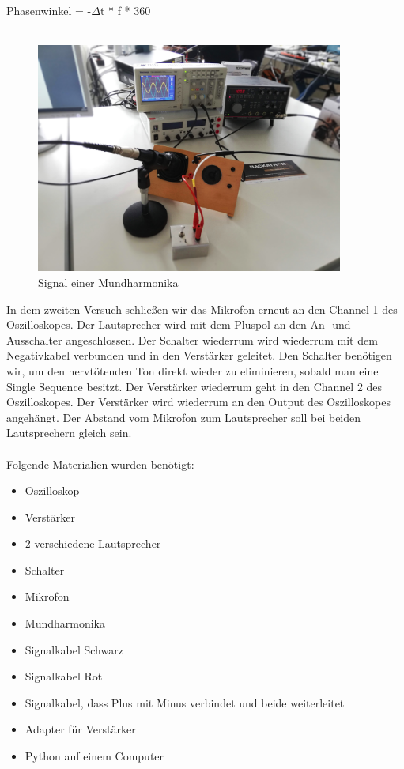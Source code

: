 \documentclass[12pt, oneside, a4paper, \docLanguage]{report}
\begin{document}
Phasenwinkel = -$\Delta$t * f * 360
\\~\\
\begin{figure}[H]
	\centering\small
	\includegraphics[width=0.9\textwidth]{media/aufbau.jpg}
	\caption{Signal einer Mundharmonika}
	\label{img:Signal einer Mundharmonika}
\end{figure}
\newpage
In dem zweiten Versuch schließen wir das Mikrofon erneut an den Channel 1 des Oszilloskopes. Der Lautsprecher wird mit dem Pluspol an den An- und Ausschalter angeschlossen.
Der Schalter wiederrum wird wiederrum mit dem Negativkabel verbunden und in den Verstärker geleitet. 
\newline
Den Schalter benötigen wir, um den nervtötenden Ton direkt wieder zu eliminieren, sobald man eine Single Sequence besitzt. Der Verstärker wiederrum geht in den Channel 2 des Oszilloskopes. 
Der Verstärker wird wiederrum an den Output des Oszilloskopes angehängt.
\newline
Der Abstand vom Mikrofon zum Lautsprecher soll bei beiden Lautsprechern gleich sein.
\\~\\
Folgende Materialien wurden benötigt: ~\par
\begin{itemize}
	\item Oszilloskop
	\item Verstärker
	\item 2 verschiedene Lautsprecher
	\item Schalter 
	\item Mikrofon
	\item Mundharmonika
	\item Signalkabel Schwarz
	\item Signalkabel Rot
	\item Signalkabel, dass Plus mit Minus verbindet und beide weiterleitet
	\item Adapter für Verstärker
	\item Python auf einem Computer
\end{itemize}
\newpage
\end{document}
